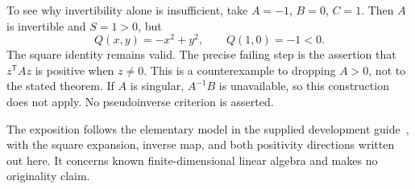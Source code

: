 \documentclass[12pt,reqno]{amsart}
\begin{document}
To see why invertibility alone is insufficient, take $A=-1$, $B=0$,
$C=1$. Then $A$ is invertible and $S=1>0$, but
\[
 Q(x,y)=-x^2+y^2,\qquad Q(1,0)=-1<0.
\]
The square identity remains valid. The precise failing step is the
assertion that $z^{\mathsf T}Az$ is positive when $z\ne0$.
This is a counterexample to dropping $A>0$, not to the stated theorem.
If $A$ is singular, $A^{-1}B$ is unavailable, so this construction does
not apply. No pseudoinverse criterion is asserted.

The exposition follows the elementary model in the supplied development
guide~\cite[Appendix A]{S-guide}, with the square expansion, inverse map,
and both positivity directions written out here. It concerns known
finite-dimensional linear algebra and makes no originality claim.


\end{document}
